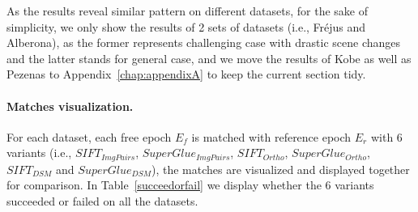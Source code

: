 
As the results reveal similar pattern on different datasets, for the sake of simplicity, we only show the results of 2 sets of datasets (i.e., Fr{\'e}jus and Alberona), as the former represents challenging case with drastic scene changes and the latter stands for general case, and we move the results of Kobe as well as Pezenas to Appendix~\ref{chap:appendixA} to keep the current section tidy.\\

\paragraph{Matches visualization.}
\label{sec:MatchVizMainBody}
For each dataset, each free epoch $E_f$ is matched with reference epoch $E_r$ with 6 variants (i.e.,  $SIFT_{ImgPairs}$,  $SuperGlue_{ImgPairs}$,  $SIFT_{Ortho}$,  $SuperGlue_{Ortho}$,  $SIFT_{DSM}$ and  $SuperGlue_{DSM}$), the matches are visualized and displayed together for comparison. In Table~\ref{succeedorfail} we display whether the 6 variants succeeded or failed on all the datasets.\\


